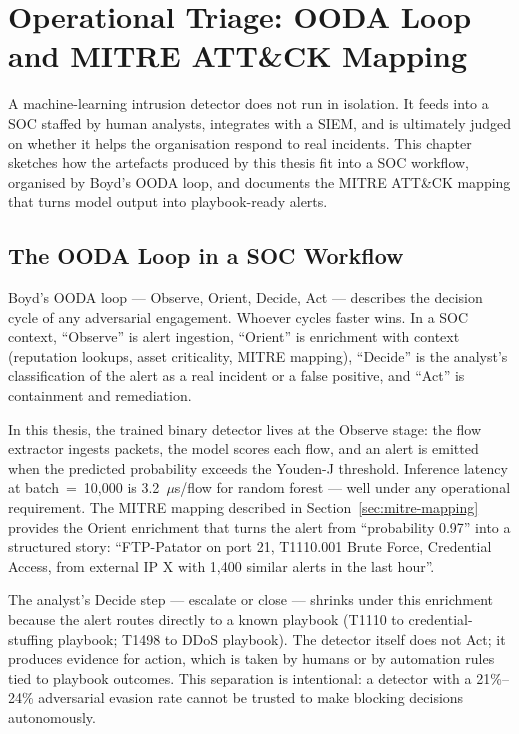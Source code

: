\chapter{Operational Triage: OODA Loop and MITRE ATT\&CK Mapping}
\label{ch:mitre}

A machine-learning intrusion detector does not run in isolation. It
feeds into a SOC staffed by human analysts, integrates with a SIEM, and
is ultimately judged on whether it helps the organisation respond to
real incidents. This chapter sketches how the artefacts produced by
this thesis fit into a SOC workflow, organised by Boyd's OODA loop, and
documents the MITRE ATT\&CK mapping that turns model output into
playbook-ready alerts.

\section{The OODA Loop in a SOC Workflow}

Boyd's OODA loop --- Observe, Orient, Decide, Act --- describes the
decision cycle of any adversarial engagement. Whoever cycles faster
wins. In a SOC context, ``Observe'' is alert ingestion, ``Orient'' is
enrichment with context (reputation lookups, asset criticality, MITRE
mapping), ``Decide'' is the analyst's classification of the alert as a
real incident or a false positive, and ``Act'' is containment and
remediation.

In this thesis, the trained binary detector lives at the Observe stage:
the flow extractor ingests packets, the model scores each flow, and an
alert is emitted when the predicted probability exceeds the Youden-J
threshold. Inference latency at batch~=~10{,}000 is 3.2~$\mu$s/flow for
random forest --- well under any operational requirement. The MITRE
mapping described in Section~\ref{sec:mitre-mapping} provides the Orient
enrichment that turns the alert from ``probability 0.97'' into a
structured story: ``FTP-Patator on port 21, T1110.001 Brute Force,
Credential Access, from external IP X with 1{,}400 similar alerts in the
last hour''.

The analyst's Decide step --- escalate or close --- shrinks under this
enrichment because the alert routes directly to a known playbook (T1110
to credential-stuffing playbook; T1498 to DDoS playbook). The detector
itself does not Act; it produces evidence for action, which is taken by
humans or by automation rules tied to playbook outcomes. This separation
is intentional: a detector with a 21\%--24\% adversarial evasion rate
cannot be trusted to make blocking decisions autonomously.

